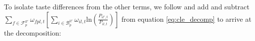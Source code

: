 To isolate taste differences from the other terms, we follow \citet{Redding2020} and add and subtract
$\sum_{f \in \mathcal{F}^{ll'}_{p}} \omega_{fpl,t}
    \left[
        \sum_{i \in \mathcal{B}^{ll'}_{p}} 
        \omega_{il,t}
        \text{ln}
        \left(
            \frac{P_{il',t}}{P_{il,t}}
        \right)
    \right]$ 
from equation \ref{eq:cle_decomp} to arrive at the decomposition:
